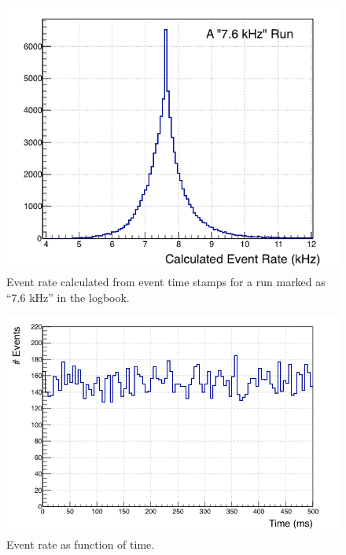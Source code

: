 \documentclass[amsmath,amssymb,notitlepage,12pt]{revtex4-1}
\begin{document}
\begin{figure}[htbp]\centering
    \includegraphics[width=12cm]{pics/7kHz.png}
    \caption{Event rate calculated from event time stamps for a run marked as ``7.6 kHz'' in the logbook. \label{fig:7.6}}
\end{figure}

\begin{figure}[htbp]\centering
    \includegraphics[width=12cm]{pics/nrate.png}
    \caption{Event rate as function of time.\label{fig:nrate}}
\end{figure}


%
\end{document}
